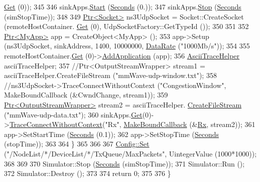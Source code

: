 \begin{DoxyCode}
      \hyperlink{classns3_1_1NodeContainer_a9ed96e2ecc22e0f5a3d4842eb9bf90bf}{Get} (0));
345 
346                 sinkApps.\hyperlink{classns3_1_1ApplicationContainer_a8eff87926507020bbe3e1390358a54a7}{Start} (\hyperlink{group__timecivil_ga33c34b816f8ff6628e33d5c8e9713b9e}{Seconds} (0.));
347                 sinkApps.\hyperlink{classns3_1_1ApplicationContainer_adfc52f9aa4020c8714679b00bbb9ddb3}{Stop} (\hyperlink{group__timecivil_ga33c34b816f8ff6628e33d5c8e9713b9e}{Seconds} (simStopTime));
348 
349                 \hyperlink{classns3_1_1Ptr}{Ptr<Socket>} ns3UdpSocket = Socket::CreateSocket (remoteHostContainer.
      \hyperlink{classns3_1_1NodeContainer_a9ed96e2ecc22e0f5a3d4842eb9bf90bf}{Get} (0), UdpSocketFactory::GetTypeId ());
350 
351 
352                 \hyperlink{classns3_1_1Ptr}{Ptr<MyApp>} app = CreateObject<MyApp> ();
353                 app->Setup (ns3UdpSocket, sinkAddress, 1400, 10000000, \hyperlink{classns3_1_1DataRate}{DataRate} (\textcolor{stringliteral}{"1000Mb/s"}));
354 
355                 remoteHostContainer.\hyperlink{classns3_1_1NodeContainer_a9ed96e2ecc22e0f5a3d4842eb9bf90bf}{Get} (0)->\hyperlink{classns3_1_1Node_ab98b4fdc4aadc86366b80e8a79a53f47}{AddApplication} (app);
356                 \hyperlink{classns3_1_1AsciiTraceHelper}{AsciiTraceHelper} asciiTraceHelper;
357                 \textcolor{comment}{//Ptr<OutputStreamWrapper> stream1 = asciiTraceHelper.CreateFileStream
       ("mmWave-udp-window.txt");}
358                 \textcolor{comment}{//ns3UdpSocket->TraceConnectWithoutContext ("CongestionWindow", MakeBoundCallback
       (&CwndChange, stream1));}
359                 \hyperlink{classns3_1_1Ptr}{Ptr<OutputStreamWrapper>} stream2 = asciiTraceHelper.
      \hyperlink{classns3_1_1AsciiTraceHelper_a44960bf2ca32835024eaedd26d1c4f94}{CreateFileStream} (\textcolor{stringliteral}{"mmWave-udp-data.txt"});
360                 sinkApps.\hyperlink{classns3_1_1ApplicationContainer_a9e565807abd4213a56566a7ccd8d7509}{Get}(0)->\hyperlink{classns3_1_1ObjectBase_a1be45f6fd561e75dcac9dfa81b2b81e4}{TraceConnectWithoutContext}(\textcolor{stringliteral}{"Rx"},
      \hyperlink{group__makeboundcallback_ga1725d6362e6065faa0709f7c93f8d770}{MakeBoundCallback} (&\hyperlink{mmwave-tcp-raytracing-example_8cc_a44926b91325d01c8749a8e4728a65087}{Rx}, stream2));
361                 app->SetStartTime (\hyperlink{group__timecivil_ga33c34b816f8ff6628e33d5c8e9713b9e}{Seconds} (0.1));
362                 app->SetStopTime (\hyperlink{group__timecivil_ga33c34b816f8ff6628e33d5c8e9713b9e}{Seconds} (stopTime));
363 
364         \}
365 
366 
367         \hyperlink{group__config_gadce03667ec621d64ce4aace85d9bcfd0}{Config::Set} (\textcolor{stringliteral}{"/NodeList/*/DeviceList/*/TxQueue/MaxPackets"}, UintegerValue (1000*1000));
368 
369 
370         Simulator::Stop (\hyperlink{group__timecivil_ga33c34b816f8ff6628e33d5c8e9713b9e}{Seconds} (simStopTime));
371         Simulator::Run ();
372         Simulator::Destroy ();
373 
374         \textcolor{keywordflow}{return} 0;
375 
376 \}
\end{DoxyCode}


